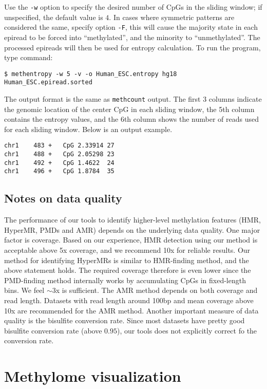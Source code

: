 \documentclass[10pt]{article}
\newcommand{\prog}[1]{\texttt{#1}}
\newcommand{\op}[1]{\texttt{#1}}
\begin{document}
{{Use the \op{-w} option to specify the desired number of CpGs
in the sliding window; if unspecified, the default value is $4$. In
cases where symmetric patterns are considered the same, specify option
\op{-F}, this will cause the majority state in each epiread to be
forced into ``methylated'', and the minority to ``unmethylated''. The
processed epireads will then be used for entropy calculation. To run
the program, type command:
\begin{verbatim}
$ methentropy -w 5 -v -o Human_ESC.entropy hg18 Human_ESC.epiread.sorted
\end{verbatim} 
The output format is the same as \prog{methcount} output. The first 3
columns indicate the genomic location of the center CpG in each
sliding window, the 5th column contains the entropy values, and the
6th column shows the number of reads used for each sliding
window. Below is an output example.
\begin{verbatim}
chr1	483	+	CpG	2.33914	27
chr1	488	+	CpG	2.05298	23
chr1	492	+	CpG	1.4622	24
chr1	496	+	CpG	1.8784	35
\end{verbatim}


\subsection{Notes on data quality}
\label{sec:notes-data-quality}
The performance of our tools to identify higher-level methylation
features (HMR, HyperMR, PMDs and AMR) depends on the underlying data
quality. One major factor is coverage. Based on our experience, HMR
detection using our method is acceptable above 5x coverage, and we
recommend 10x for reliable results. Our method for identifying
HyperMRs is similar to HMR-finding method, and the above statement
holds. The required coverage therefore is even lower since the
PMD-finding method internally works by accumulating CpGs in
fixed-length bins. We feel $\sim$3x is sufficient. The AMR method
depends on both coverage and read length. Datasets with read length
around 100bp and mean coverage above 10x are recommended for the AMR
method. Another important measure of data quality is the bisulfite
conversion rate. Since most datasets have pretty good bisulfite
conversion rate (above $0.95$), our tools does not explicitly correct
fo the conversion rate.

\section{Methylome visualization}
\label{sec:visualization}

}}
\end{document}
